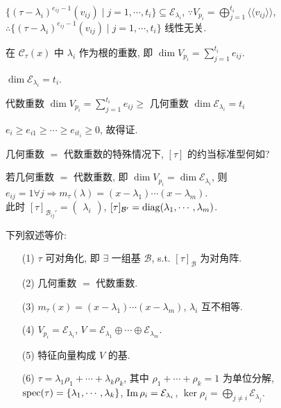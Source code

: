 \documentclass{note}
\begin{document}
$\{(\tau-\lambda_i)^{e_{ij}-1}(v_{ij})\mid j=1,\cdots,t_i\}\subseteq\mathcal{E}_{\lambda_i}$, $\because V_{p_i}=\bigoplus_{j=1}^{t_i}\langle\langle v_{ij}\rangle\rangle$, $\therefore\{(\tau-\lambda_i)^{e_{ij}-1}(v_{ij})\mid j=1,\cdots,t_i\}$ 线性无关.

\begin{df}[代数重数]
    在 $\mathcal{C}_{\tau}(x)$ 中 $\lambda_i$ 作为根的重数, 即 $\dim V_{p_i}=\sum_{j=1}^{t_i}e_{ij}$.
\end{df}

\begin{df}[几何重数]
    $\dim\mathcal{E}_{\lambda_i}=t_i$.
\end{df}

\begin{thm}[(课本定理 8.5)]
    代数重数 $\dim V_{p_i}=\sum_{j=1}^{t_i}e_{ij}\geq$ 几何重数 $\dim\mathcal{E}_{\lambda_i}=t_i$
\end{thm}
\begin{pf}
    $e_i\geq e_{i1}\geq\cdots\geq e_{it_i}\geq 0$, 故得证.
\end{pf}

几何重数 $=$ 代数重数的特殊情况下, $[\tau]$ 的约当标准型何如?

若几何重数 $=$ 代数重数, 即 $\dim V_{p_i}=\dim\mathcal{E}_{\lambda_i}$, 则 $e_{ij}=1\forall j\Longrightarrow m_{\tau}(\lambda)=(x-\lambda_1)\cdots(x-\lambda_m)$.\\
此时 $[\tau]_{\mathcal{B}_{ij}'}=\begin{pmatrix}
    \lambda_i
\end{pmatrix}$, $[\tau]_{\mathcal{B}'}=\operatorname{diag}(\lambda_1,\cdots,\lambda_m)$.

\begin{thm}[(课本定理 8.10, 8.11, 8.18)]\label{thm-8.10-8.11-8.18}
    下列叙述等价:
    \begin{itemize}
        \item[(1)] $\tau$ 可对角化, 即 $\exists$ 一组基 $\mathcal{B}$, s.t. $[\tau]_{\mathcal{B}}$ 为对角阵.
        \item[(2)] 几何重数 $=$ 代数重数.
        \item[(3)] $m_{\tau}(x)=(x-\lambda_1)\cdots(x-\lambda_m)$, $\lambda_i$ 互不相等.
        \item[(4)] $V_{p_i}=\mathcal{E}_{\lambda_i}$, $V=\mathcal{E}_{\lambda_1}\oplus\cdots\oplus\mathcal{E}_{\lambda_m}$.
        \item[(5)] 特征向量构成 $V$ 的基.
        \item[(6)] $\tau=\lambda_1\rho_1+\cdots+\lambda_k\rho_k$, 其中 $\rho_1+\cdots+\rho_k=1$ 为单位分解, $\operatorname{spec}(\tau)=\{\lambda_1,\cdots,\lambda_k\}$, $\operatorname{Im}\rho_i=\mathcal{E}_{\lambda_i}$, $\ker\rho_i=\bigoplus_{j\neq i}\mathcal{E}_{\lambda_j}$.
    \end{itemize}
\end{thm}
\end{document}
